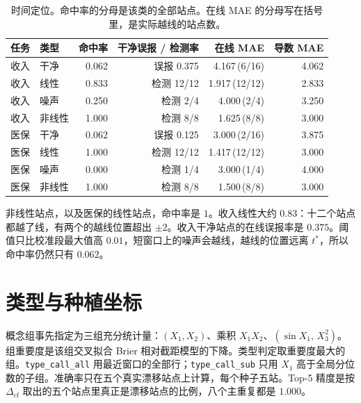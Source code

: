 \documentclass[11pt,a4paper,fontset=none]{ctexart}
\newcommand{\Dcf}{\ensuremath{\Delta_{\mathrm{cf}}}}
\begin{document}
\begin{table}[ht]
\centering
\caption{时间定位。命中率的分母是该类的全部站点。在线 MAE 的分母写在括号里，是实际越线的站点数。}
\label{tab:time}
\small
\begin{tabular}{@{}llrrrr@{}}
\toprule
任务 & 类型 & 命中率 & 干净误报 / 检测率 & 在线 MAE & 导数 MAE \\
\midrule
收入 & 干净 & 0.062 & 误报 0.375 & 4.167\,(6/16) & 4.062 \\
收入 & 线性 & 0.833 & 检测 12/12 & 1.917\,(12/12) & 2.833 \\
收入 & 噪声 & 0.250 & 检测 2/4 & 4.000\,(2/4) & 3.250 \\
收入 & 非线性 & 1.000 & 检测 8/8 & 1.625\,(8/8) & 3.000 \\
医保 & 干净 & 0.062 & 误报 0.125 & 3.000\,(2/16) & 3.875 \\
医保 & 线性 & 1.000 & 检测 12/12 & 1.417\,(12/12) & 3.000 \\
医保 & 噪声 & 0.000 & 检测 1/4 & 3.000\,(1/4) & 4.000 \\
医保 & 非线性 & 1.000 & 检测 8/8 & 1.500\,(8/8) & 3.000 \\
\bottomrule
\end{tabular}
\end{table}

非线性站点，以及医保的线性站点，命中率是 \(1\)。收入线性大约 \(0.83\)：十二个站点都越了线，有两个的越线位置超出 \(\pm 2\)。收入干净站点的在线误报率是 \(0.375\)。阈值只比校准段最大值高 \(0.01\)，短窗口上的噪声会越线，越线的位置远离 \(t^{\ast}\)，所以命中率仍然只有 \(0.062\)。

\section{类型与种植坐标}

概念组事先指定为三组充分统计量：\((X_1,X_2)\)、乘积 \(X_1 X_2\)、\((\sin X_1,\, X_3^{2})\)。组重要度是该组交叉拟合 Brier 相对截距模型的下降。类型判定取重要度最大的组。\texttt{type\_call\_all} 用最近窗口的全部行；\texttt{type\_call\_sub} 只用 \(X_1\) 高于全局分位数的子组。准确率只在五个真实漂移站点上计算，每个种子五站。Top-5 精度是按 \(\Dcf\) 取出的五个站点里真正是漂移站点的比例，八个主重复都是 \(1.000\)。
\end{document}
